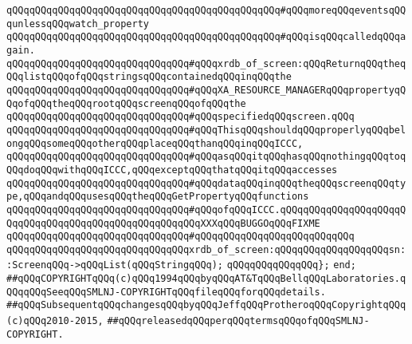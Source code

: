 \verb|qQQqqQQqqQQqqQQqqQQqqQQqqQQqqQQqqQQqqQQqqQQqqQQq#qQQqmoreqQQqeventsqQQqunlessqQQqwatch_property|\newline
\verb|qQQqqQQqqQQqqQQqqQQqqQQqqQQqqQQqqQQqqQQqqQQqqQQq#qQQqisqQQqcalledqQQqagain.|\newline
\newline
\newline
\newline
\newline
\verb|qQQqqQQqqQQqqQQqqQQqqQQqqQQqqQQq#qQQqxrdb_of_screen:qQQqReturnqQQqtheqQQqlistqQQqofqQQqstringsqQQqcontainedqQQqinqQQqthe|\newline
\verb|qQQqqQQqqQQqqQQqqQQqqQQqqQQqqQQq#qQQqXA_RESOURCE_MANAGERqQQqpropertyqQQqofqQQqtheqQQqrootqQQqscreenqQQqofqQQqthe|\newline
\verb|qQQqqQQqqQQqqQQqqQQqqQQqqQQqqQQq#qQQqspecifiedqQQqscreen.qQQq|\newline
\verb|qQQqqQQqqQQqqQQqqQQqqQQqqQQqqQQq#qQQqThisqQQqshouldqQQqproperlyqQQqbelongqQQqsomeqQQqotherqQQqplaceqQQqthanqQQqinqQQqICCC,|\newline
\verb|qQQqqQQqqQQqqQQqqQQqqQQqqQQqqQQq#qQQqasqQQqitqQQqhasqQQqnothingqQQqtoqQQqdoqQQqwithqQQqICCC,qQQqexceptqQQqthatqQQqitqQQqaccesses|\newline
\verb|qQQqqQQqqQQqqQQqqQQqqQQqqQQqqQQq#qQQqdataqQQqinqQQqtheqQQqscreenqQQqtype,qQQqandqQQqusesqQQqtheqQQqGetPropertyqQQqfunctions|\newline
\verb|qQQqqQQqqQQqqQQqqQQqqQQqqQQqqQQq#qQQqofqQQqICCC.qQQqqQQqqQQqqQQqqQQqqQQqqQQqqQQqqQQqqQQqqQQqqQQqqQQqqQQqXXXqQQqBUGGOqQQqFIXME|\newline
\verb|qQQqqQQqqQQqqQQqqQQqqQQqqQQqqQQq#qQQqqQQqqQQqqQQqqQQqqQQqqQQq|\newline
\verb|qQQqqQQqqQQqqQQqqQQqqQQqqQQqqQQqxrdb_of_screen:qQQqqQQqqQQqqQQqqQQqsn::ScreenqQQq->qQQqList(qQQqStringqQQq);|\newline
\verb|qQQqqQQqqQQqqQQq};|\newline
\newline
\verb|end;|\newline
\newline
\newline
\verb|##qQQqCOPYRIGHTqQQq(c)qQQq1994qQQqbyqQQqAT&TqQQqBellqQQqLaboratories.qQQqqQQqSeeqQQqSMLNJ-COPYRIGHTqQQqfileqQQqforqQQqdetails.|\newline
\verb|##qQQqSubsequentqQQqchangesqQQqbyqQQqJeffqQQqProtheroqQQqCopyrightqQQq(c)qQQq2010-2015,|\newline
\verb|##qQQqreleasedqQQqperqQQqtermsqQQqofqQQqSMLNJ-COPYRIGHT.|\newline

